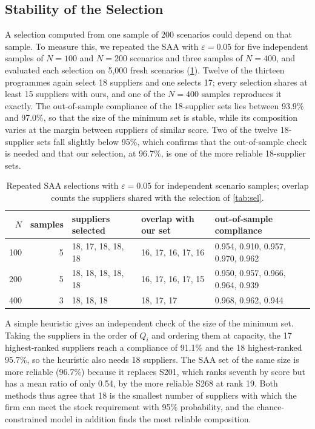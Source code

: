 \documentclass[11pt,a4paper]{article}
\begin{document}
\subsection{Stability of the Selection}
A selection computed from one sample of 200 scenarios could depend on that sample.
To measure this, we repeated the SAA with $\varepsilon=0.05$ for five independent samples of $N=100$ and $N=200$ scenarios and three samples of $N=400$, and evaluated each selection on 5{,}000 fresh scenarios (\cref{tab:saa-stab}).
Twelve of the thirteen programmes again select 18 suppliers and one selects 17; every selection shares at least 15 suppliers with ours, and one of the $N=400$ samples reproduces it exactly.
The out-of-sample compliance of the 18-supplier sets lies between 93.9\% and 97.0\%, so that the size of the minimum set is stable, while its composition varies at the margin between suppliers of similar score.
Two of the twelve 18-supplier sets fall slightly below 95\%, which confirms that the out-of-sample check is needed and that our selection, at 96.7\%, is one of the more reliable 18-supplier sets.

\begin{table}[ht]
\centering
\caption{Repeated SAA selections with $\varepsilon=0.05$ for independent scenario samples; overlap counts the suppliers shared with the selection of \cref{tab:sel}.}\label{tab:saa-stab}
\small
\begin{tabular}{rrlll}
\toprule
$N$ & samples & suppliers selected & overlap with our set & out-of-sample compliance \\
\midrule
100 & 5 & 18, 17, 18, 18, 18 & 16, 17, 16, 17, 16 & 0.954, 0.910, 0.957, 0.970, 0.962 \\
200 & 5 & 18, 18, 18, 18, 18 & 16, 17, 16, 17, 15 & 0.950, 0.957, 0.966, 0.964, 0.939 \\
400 & 3 & 18, 18, 18 & 18, 17, 17 & 0.968, 0.962, 0.944 \\
\bottomrule
\end{tabular}
\end{table}

A simple heuristic gives an independent check of the size of the minimum set.
Taking the suppliers in the order of $Q_i$ and ordering them at capacity, the 17 highest-ranked suppliers reach a compliance of 91.1\% and the 18 highest-ranked 95.7\%, so the heuristic also needs 18 suppliers.
The SAA set of the same size is more reliable (96.7\%) because it replaces S201, which ranks seventh by score but has a mean ratio of only 0.54, by the more reliable S268 at rank 19.
Both methods thus agree that 18 is the smallest number of suppliers with which the firm can meet the stock requirement with 95\% probability, and the chance-constrained model in addition finds the most reliable composition.
\end{document}
